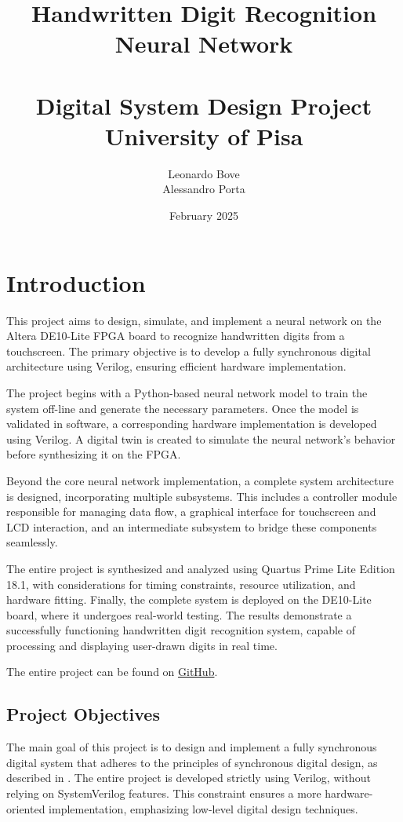 \documentclass[11pt]{report}
\title{%
    Handwritten Digit Recognition Neural Network  \\
    \medskip \\
    \large Digital System Design Project \\
    \large University of Pisa}
\author{Leonardo Bove \\
        Alessandro Porta}
\date{February 2025}
\begin{document}
\maketitle
\newpage
\tableofcontents

\chapter{Introduction}  

This project aims to design, simulate, and implement a neural network on the Altera DE10-Lite FPGA board to recognize handwritten digits from a touchscreen. The primary objective is to develop a fully synchronous digital architecture using Verilog, ensuring efficient hardware implementation.  

The project begins with a Python-based neural network model to train the system off-line and generate the necessary parameters. Once the model is validated in software, a corresponding hardware implementation is developed using Verilog. A digital twin is created to simulate the neural network's behavior before synthesizing it on the FPGA.  

Beyond the core neural network implementation, a complete system architecture is designed, incorporating multiple subsystems. This includes a controller module responsible for managing data flow, a graphical interface for touchscreen and LCD interaction, and an intermediate subsystem to bridge these components seamlessly.  

The entire project is synthesized and analyzed using Quartus Prime Lite Edition 18.1, with considerations for timing constraints, resource utilization, and hardware fitting. Finally, the complete system is deployed on the DE10-Lite board, where it undergoes real-world testing. The results demonstrate a successfully functioning handwritten digit recognition system, capable of processing and displaying user-drawn digits in real time.  

The entire project can be found on \href{https://github.com/leonardobove/handwritten_digit_recognition}{GitHub}.

\section{Project Objectives}  

The main goal of this project is to design and implement a fully synchronous digital system that adheres to the principles of synchronous digital design, as described in \cite{wakerly2005digital}. The entire project is developed strictly using Verilog, without relying on SystemVerilog features. This constraint ensures a more hardware-oriented implementation, emphasizing low-level digital design techniques.  
\end{document}
